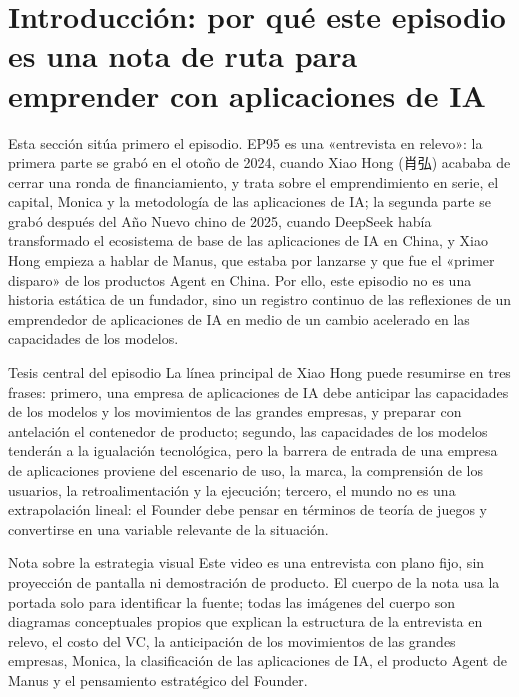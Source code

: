 \section{Introducción: por qué este episodio es una nota de ruta para emprender con aplicaciones de IA}

Esta sección sitúa primero el episodio. EP95 es una «entrevista en relevo»: la primera parte se grabó en el otoño de 2024, cuando Xiao Hong (肖弘) acababa de cerrar una ronda de financiamiento, y trata sobre el emprendimiento en serie, el capital, Monica y la metodología de las aplicaciones de IA; la segunda parte se grabó después del Año Nuevo chino de 2025, cuando DeepSeek había transformado el ecosistema de base de las aplicaciones de IA en China, y Xiao Hong empieza a hablar de Manus, que estaba por lanzarse y que fue el «primer disparo» de los productos Agent en China. Por ello, este episodio no es una historia estática de un fundador, sino un registro continuo de las reflexiones de un emprendedor de aplicaciones de IA en medio de un cambio acelerado en las capacidades de los modelos.

\begin{importantbox}{Tesis central del episodio}
La línea principal de Xiao Hong puede resumirse en tres frases: primero, una empresa de aplicaciones de IA debe anticipar las capacidades de los modelos y los movimientos de las grandes empresas, y preparar con antelación el contenedor de producto; segundo, las capacidades de los modelos tenderán a la igualación tecnológica, pero la barrera de entrada de una empresa de aplicaciones proviene del escenario de uso, la marca, la comprensión de los usuarios, la retroalimentación y la ejecución; tercero, el mundo no es una extrapolación lineal: el Founder debe pensar en términos de teoría de juegos y convertirse en una variable relevante de la situación.
\end{importantbox}

\begin{knowledgebox}{Nota sobre la estrategia visual}
Este video es una entrevista con plano fijo, sin proyección de pantalla ni demostración de producto. El cuerpo de la nota usa la portada solo para identificar la fuente; todas las imágenes del cuerpo son diagramas conceptuales propios que explican la estructura de la entrevista en relevo, el costo del VC, la anticipación de los movimientos de las grandes empresas, Monica, la clasificación de las aplicaciones de IA, el producto Agent de Manus y el pensamiento estratégico del Founder.
\end{knowledgebox}

